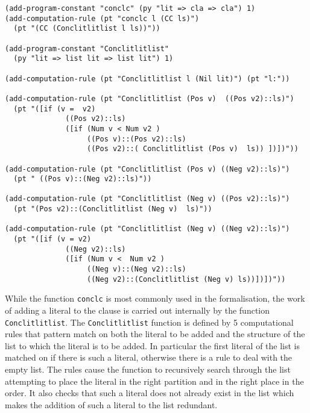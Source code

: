 \begin{lstlisting}[caption =  "Functions for the insertion of a literal into a clause"]
(add-program-constant "conclc" (py "lit => cla => cla") 1)
(add-computation-rule (pt "conclc l (CC ls)") 
  (pt "(CC (Conclitlitlist l ls))"))

(add-program-constant "Conclitlitlist" 
  (py "lit => list lit => list lit") 1)

(add-computation-rule (pt "Conclitlitlist l (Nil lit)") (pt "l:"))

(add-computation-rule (pt "Conclitlitlist (Pos v)  ((Pos v2)::ls)")
  (pt "([if (v =  v2)                                                                                                       
              ((Pos v2)::ls)                                                                                       
              ([if (Num v < Num v2 )                                                                               
                   ((Pos v)::(Pos v2)::ls)                                                                         
                   ((Pos v2)::( Conclitlitlist (Pos v)  ls)) ])])"))

(add-computation-rule (pt "Conclitlitlist (Pos v) ((Neg v2)::ls)")
  (pt " ((Pos v)::(Neg v2)::ls)"))

(add-computation-rule (pt "Conclitlitlist (Neg v) ((Pos v2)::ls)")
  (pt "(Pos v2)::(Conclitlitlist (Neg v)  ls)"))

(add-computation-rule (pt "Conclitlitlist (Neg v) ((Neg v2)::ls)")
  (pt "([if (v = v2)                                                                                                        
              ((Neg v2)::ls)                                                                                      
              ([if (Num v <  Num v2 )                                                                              
                   ((Neg v)::(Neg v2)::ls)                                                                        
                   ((Neg v2)::(Conclitlitlist (Neg v) ls))])])"))
\end{lstlisting}

While the function \texttt{conclc}  is most commonly used in the formalisation, the work of adding a literal to the clause is carried out internally by the function \texttt{Conclitlitlist}. The \texttt{Conclitlitlist} function is defined by 5 computational rules that pattern match on both the literal to be added and the structure of the list to which the literal is to be added. In particular the first literal of the list is matched on if there is such a literal, otherwise there is a rule to deal with the empty list. The rules cause the function to recursively search through the list attempting to place the literal in the right partition and in the right place in the order. It also checks that such a literal does not already exist in the list which makes the addition of such a literal to the list redundant.

